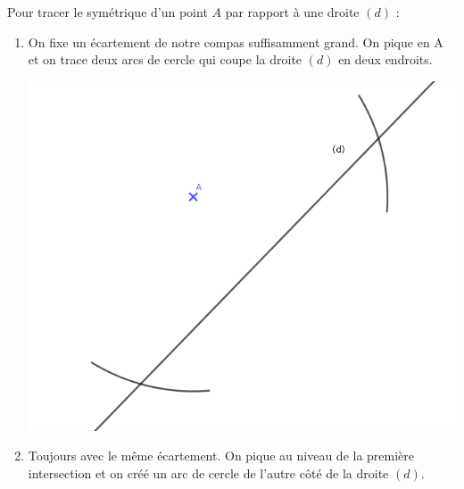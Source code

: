 \documentclass[12pt,a4paper]{article}
\begin{document}
	\begin{mymeth}
		Pour tracer le symétrique d'un point $A$ par rapport à une droite $(d)$ :
		
		
		\begin{enumerate}
				
			
			\item  On fixe un écartement de notre compas suffisamment grand. On pique en A et on trace deux arcs de cercle qui coupe la droite $(d)$ en deux endroits.
			
			\begin{center}
				\includegraphics[scale=0.2]{meth1}
			\end{center}
		
		
			\item Toujours avec le même écartement. On pique au niveau de la première intersection et on créé un arc de cercle de l'autre côté de la droite $(d)$.
			

\end{enumerate}
\end{mymeth}
\end{document}
